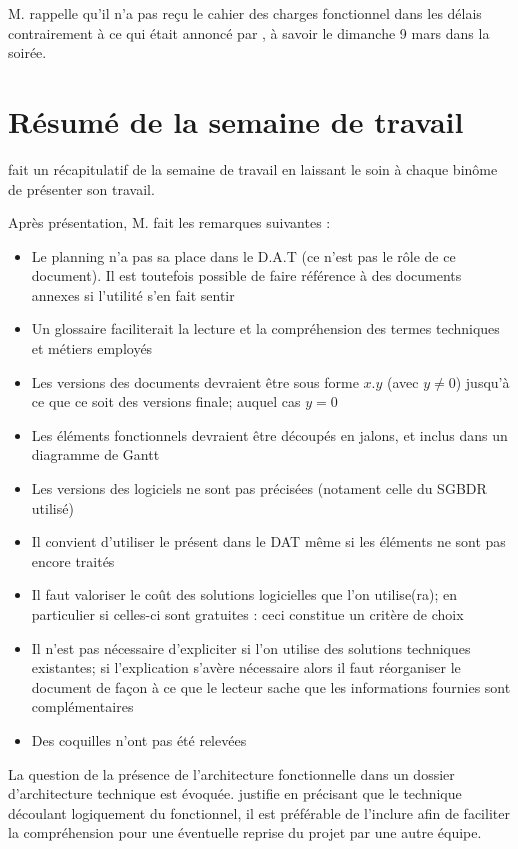 \documentclass[11pt,fleqn]{report}
\begin{document}
M. \Agopian rappelle qu'il n'a pas reçu le cahier des charges fonctionnel dans les délais contrairement à ce qui était annoncé par \amo, à savoir le dimanche 9 mars dans la soirée.

\section{Résumé de la semaine de travail}

\amo fait un récapitulatif de la semaine de travail en laissant le soin à chaque binôme de présenter son travail.

Après présentation, M. \Agopian fait les remarques suivantes :
\begin{itemize}
    \item Le planning n'a pas sa place dans le D.A.T (ce n'est pas le rôle de ce document). Il est toutefois possible de faire référence à des documents annexes si l'utilité s'en fait sentir
    \item Un glossaire faciliterait la lecture et la compréhension des termes techniques et métiers employés
    \item Les versions des documents devraient être sous forme $x$.$y$ (avec $y\ne0$) jusqu'à ce que ce soit des versions finale; auquel cas $y=0$
    \item Les éléments fonctionnels devraient être découpés en jalons, et inclus dans un diagramme de Gantt
    \item Les versions des logiciels ne sont pas précisées (notament celle du SGBDR utilisé)
    \item Il convient d'utiliser le présent dans le DAT même si les éléments ne sont pas encore traités
    \item Il faut valoriser le coût des solutions logicielles que l'on utilise(ra); en particulier si celles-ci sont gratuites : ceci constitue un critère de choix
    \item Il n'est pas nécessaire d'expliciter si l'on utilise des solutions techniques existantes; si l'explication s'avère nécessaire alors il faut réorganiser le document de façon à ce que le lecteur sache que les informations fournies sont complémentaires
    \item Des coquilles n'ont pas été relevées\\
\end{itemize}
La question de la présence de l'architecture fonctionnelle dans un dossier d'architecture technique est évoquée. \amo justifie en précisant que le technique découlant logiquement du fonctionnel, il est préférable de l'inclure afin de faciliter la compréhension pour une éventuelle reprise du projet par une autre équipe.
\end{document}
